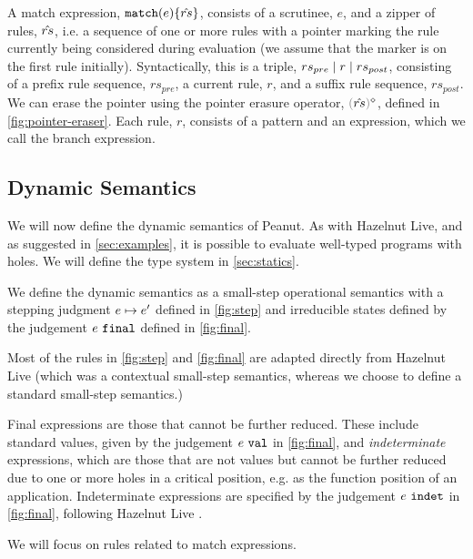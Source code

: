 \documentclass[runningheads,envcountsame,a4paper]{llncs}
\begin{document}
A match expression, $\mathtt{match}(e) \{\hat{rs}\}$, 
consists of a scrutinee, $e$, and a zipper of rules, $\hat{rs}$, i.e. a sequence of one or more rules with a pointer marking the rule currently being considered during evaluation (we assume that the marker is on the first rule initially). Syntactically, this is a triple, $rs_{pre} \mid r \mid rs_{post}$, consisting of a prefix rule sequence, $rs_{pre}$, a current rule, $r$, and a suffix rule sequence, $rs_{post}$. We can erase the pointer using the pointer erasure operator, $\rmpointer{\zrules}$, defined in \autoref{fig:pointer-eraser}. 
Each rule, $r$, consists of a pattern and an expression, which we call the branch expression.



\subsection{Dynamic Semantics}\label{sec:dynamics}
We will now define the dynamic semantics of Peanut. 
As with Hazelnut Live, and as suggested in \autoref{sec:examples}, it is possible to evaluate well-typed programs with holes. We will define the type system in \autoref{sec:statics}.




We define the dynamic semantics as a small-step operational semantics with a stepping judgment
$e \mapsto e'$ defined in \autoref{fig:step} and irreducible states defined by the judgement $e ~\mathtt{final}$ defined in \autoref{fig:final}. 

Most of the rules in \autoref{fig:step} and \autoref{fig:final} are adapted directly from Hazelnut Live \cite{DBLP:journals/pacmpl/OmarVCH19} (which was a contextual small-step semantics, whereas we choose to define a standard small-step semantics.) 

Final expressions are those that cannot be further reduced. These include
standard values, given by the judgement $e ~\mathtt{val}$ in \autoref{fig:final}, 
and \emph{indeterminate} expressions, which are those that are not values but cannot be further reduced due to one or more holes in a critical position, 
e.g. as the function position of an application. Indeterminate expressions
are specified by the judgement $e ~\mathtt{indet}$ in \autoref{fig:final}, following Hazelnut Live \cite{DBLP:journals/pacmpl/OmarVCH19}.

We will focus on rules related to match expressions.
\end{document}
